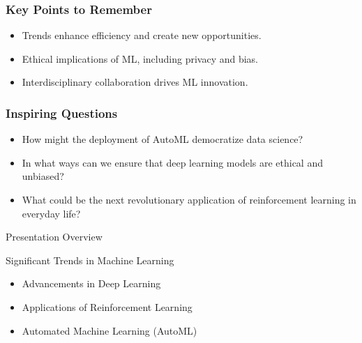 \documentclass[aspectratio=169]{beamer}
\begin{document}
\begin{frame}[fragile]
    \frametitle{Key Points to Remember}
    \begin{itemize}
        \item Trends enhance efficiency and create new opportunities.
        \item Ethical implications of ML, including privacy and bias.
        \item Interdisciplinary collaboration drives ML innovation.
    \end{itemize}
\end{frame}

\begin{frame}[fragile]
    \frametitle{Inspiring Questions}
    \begin{itemize}
        \item How might the deployment of AutoML democratize data science?
        \item In what ways can we ensure that deep learning models are ethical and unbiased?
        \item What could be the next revolutionary application of reinforcement learning in everyday life?
    \end{itemize}
\end{frame}

\begin{frame}[fragile]{Presentation Overview}
  \tableofcontents[hideallsubsections]
\end{frame}

\begin{frame}[fragile]{Significant Trends in Machine Learning}
  \begin{itemize}
    \item Advancements in Deep Learning
    \item Applications of Reinforcement Learning
    \item Automated Machine Learning (AutoML)
  \end{itemize}
\end{frame}
\end{document}
